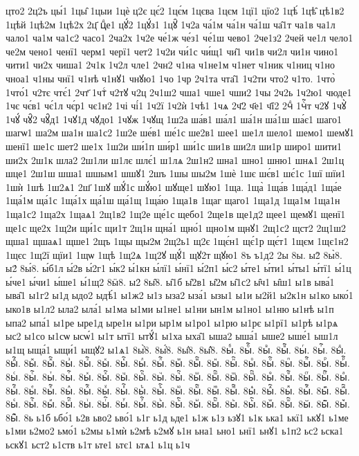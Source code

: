 {цто2
2ц2ъ
цы́1
1цы̑
1цыи
1цѐ
ц2є
цє́2
1цє́м
1цєва
1цєм
1цї1
цїо2
1цѣ́
1цѣ̑
цѣ1в2
1цѣй
1цѣ2м
1цѣ2х
2ц҃
цⷣе1
цꙋ́2
1цꙋ́з1
1цꙋ̑
1ч2а
ча́1м
ча́1н
ча́1ш
ча̑1т
ча1в
ча1л
чало1
ча1м
ча1с2
часо1
2ча2х
1ч2е
че́1ж
че́з1
че́1ш
чево1
2че1з2
2чей
че1л
чело1
че2м
чено1
ченї1
черм1
черї1
чет2
1ч2и
чи́1с
чи́щ1
чи̑1
чи1в
чи2л
чи1н
чино1
чити1
чи2х
чиша1
2ч1к
1ч2л
чле1
2чн2
ч1на
ч1не1м
ч1нет
ч1ник
ч1ниц
ч1но
чноа1
ч1ны
чнї1
ч1нѣ
ч1нꙋ1
чнꙋю1
1чо
1чр
2ч1та
чта̑1
1ч2ти
что2
ч1то.
1что̀
1что́1
ч2тє
чтє́1
2чт҃
1чтⷭ
ч2тꙋ
ч2ц
2ч1ш2
чша1
чше1
чши2
1чы
2ч2ь
1ч2ю1
чюде1
1чє
чє́в1
чє́1л
чє́р1
чє1н2
1чі
чі́1
1ч2ї
1ч2ѝ
1чѣ1
1чѧ
2ч҃2
ч҃е1
ч҃ї2
2чⷣ
1чⷭ҇т
ч2ꙋ
1чꙋ̀
1чꙋ́
чꙋ̑2
чꙋ̑д1
1чꙋ1д
чꙋдо1
1чꙋж
1чꙋщ
1ш2а
ша́в1
ша́л1
ша́1н
ша́1ш
ша́є1
шаго1
шагѡ1
ша2м
ша1н
ша1с2
1ш2е
ше́в1
ше́1с
ше2в1
шее1
ше1л
шело1
шемо1
шемꙋ1
шенї1
ше1с
шет2
ше1х
1ш2и
ши́1п
ши́р1
ши́1с
ши1в
ши2л
ши1р
широ1
шити1
ши2х
2ш1к
шла2
2ш1ли
ш1лє
шлє́1
ш1лѧ
2ш1н2
шна1
шно1
шню1
шнѧ1
2ш1ц
шце1
2ш1ш
шша1
шшым1
шшꙋ1
2шъ
1шы
шы2м
1шѐ
1шє
шє́в1
шє́1с
1шї
шїи1
1шѝ
1шѣ
1ш2ѧ1
2ш҃
1шꙋ
шꙋ́1с
шꙋ́ю1
шꙋще1
шꙋю1
1ща.
1ща̀
1ща́в
1ща́д1
1ща́е
1ща́1м
ща́1с
1ща́1х
ща́1ш
ща́1щ
1ща́ю
1ща1в
1щаг
щаго1
1ща1д
1ща1м
1ща1н
1ща1с2
1ща2х
1щаѧ1
2щ1в2
1щ2е
ще́1с
щебо1
2ще1в
ще1д2
щее1
щемꙋ1
щенї1
ще1с
ще2х
1щ2и
щи́1с
щи1т
2щ1н
щна́1
щно́1
щно1м
щнꙋ1
2щ1с2
щст2
2щ1ш2
щша1
щшаѧ1
щше1
2щъ
1щы
щы2м
2щ2ь1
щ2є
1щє́н1
щє́1р
щє́т1
1щєм
1щє1н2
1щєс
1щ2ї
щїи1
1щѡ
1щѣ
1щ2ѧ
1щ2ꙋ
щꙋ́1
щꙋ2т
щꙋю1
8ъ
ъ1д2
2ы
8ы.
ы2̀
8ы̀8.
ы2́
8ы́8.
ы́б1л
ы́2в
ы́2г1
ы́к2
ы́1кн
ы́лї1
ы́нї1
ы́2п1
ы́с2
ы́те1
ы́ти1
ы́ты1
ы́тї1
ы́1ц
ы́че1
ы́чи1
ы́ше1
ы́1щ2
8ӹ8.
ы2̑
8ы̑8.
ы̑1б
ы̑2в1
ы̑2м
ы̑1с2
ы̑ч1
ы̑ш1
ы1в
ыва́1
ыва̑1
ы1г2
ы1д
ыдо2
ыдѣ́1
ы1ж2
ы1з
ыза2
ыза́1
ызы1
ы1и
ы2й1
ы2к1н
ы1ко
ыко́1
ыко1в
ы1л2
ыла2
ыла́1
ы1ма
ы1ми
ы1не1
ы1ни
ын1м
ы1но1
ы1ню
ы1нѣ
ы1п
ыпа2
ыпа́1
ы1ре
ыре1д
ыре1н
ы1ри
ыр1м
ы1ро1
ы1рю
ы1рє
ы1рї1
ы1рѣ
ы1рѧ
ыс2
ы1со
ы1сѡ
ысѡ́1
ы1т
ытї1
ытꙋ́1
ы1ха
ыха̑1
ыша2
ыша́1
ыше2
ыше́1
ыш1л
ы1щ
ыща́1
ыщи́1
ыщꙋ2
ы1ѧ1
8ы҆̀8.
8ы҆́8.
8ы҆̈8.
8ы҆̑8.
8ыⷠ.
8ыⷠ҇.
8ыⷡ.
8ыⷡ҇.
8ыⷢ.
8ыⷢ҇.
8ыⷣ.
8ыⷣ҇.
8ыⷤ.
8ыⷤ҇.
8ыⷥ.
8ыⷥ҇.
8ыⷦ.
8ыⷦ҇.
8ыⷧ.
8ыⷧ҇.
8ыⷨ.
8ыⷨ҇.
8ыⷩ.
8ыⷩ҇.
8ыⷪ.
8ыⷪ҇.
8ыⷫ.
8ыⷫ҇.
8ыⷬ.
8ыⷬ҇.
8ыⷭ.
8ыⷭ҇.
8ыⷮ.
8ыⷮ҇.
8ыⷯ.
8ыⷯ҇.
8ыⷰ.
8ыⷰ҇.
8ыⷱ.
8ыⷱ҇.
8ыⷲ.
8ыⷲ҇.
8ыⷳ.
8ыⷳ҇.
8ыⷴ.
8ыⷴ҇.
8ыⷵ.
8ыⷵ҇.
8ыⷶ.
8ыⷶ҇.
8ыⷷ.
8ыⷷ҇.
8ыⷸ.
8ыⷸ҇.
8ыⷹ.
8ыⷹ҇.
8ыⷺ.
8ыⷺ҇.
8ыⷻ.
8ыⷻ҇.
8ыⷼ.
8ыⷼ҇.
8ыⷽ.
8ыⷽ҇.
8ыⷾ.
8ыⷾ҇.
8ыⷿ.
8ыⷿ҇.
8ыꙴ.
8ыꙴ҇.
8ыꙵ.
8ыꙵ҇.
8ыꙶ.
8ыꙶ҇.
8ыꙷ.
8ыꙷ҇.
8ыꙸ.
8ыꙸ҇.
8ыꙹ.
8ыꙹ҇.
8ыꙺ.
8ыꙺ҇.
8ыꙻ.
8ыꙻ҇.
8ы꙼.
8ы꙼҇.
8ы꙽.
8ы꙽҇.
8ь
ь1б
ьбо́1
ь2в
ьво2
ьво́1
ь1г
ь1д
ьде1
ь1ж
ь1з
ьзꙋ1
ь1к
ька1
ькї1
ькꙋ1
ь1ме
ь1ми
ь2мо2
ьмо́1
ь2мы
ь1мѝ
ь2мѣ
ь2мꙋ
ь1н
ьна1
ьно1
ьнї1
ьнꙋ1
ь1п2
ьс2
ьска1
ьскꙋ1
ьст2
ь1ств
ь1т
ьте1
ьтє1
ьтѧ1
ь1ц
ь1ч
}
